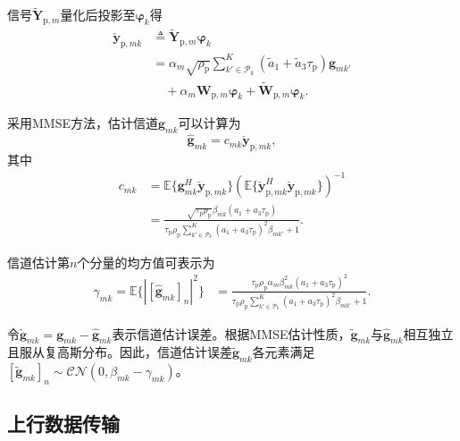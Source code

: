 信号$\tilde{\mathbf{Y}}_{\text{p},m}$量化后投影至$\boldsymbol{\varphi}_k$得
\begin{align}
\label{eqn-5}
\check{\mathbf{y}}_{\text{p},mk} &\triangleq\tilde{\mathbf{Y}}_{\text{p},m}\boldsymbol{\varphi}_k\nonumber\\
&=\alpha_m\sqrt{\rho_\text{p}}\sum_{k'\in\mathcal{P}_k}^{K}(\tilde{a}_1+\tilde{a}_3\tau_\text{p})\mathbf{g}_{mk'}\nonumber\\
&\quad+\alpha_m\mathbf{W}_{\text{p},m}\boldsymbol{\varphi}_k+\tilde{\mathbf{W}}_{\text{p},m}\boldsymbol{\varphi}_k.
\end{align}
\begin{lemma}\label{lemma1}
	\rm{采用MMSE方法，估计信道$\mathbf{g}_{mk}$可以计算为}
	\setlength\arraycolsep{1pt}   %
	\begin{equation}
		\label{eqn-6}
		\hat{\mathbf{g}}_{mk}=c_{mk}\check{\mathbf{y}}_{\text{p},mk},
	\end{equation}
	其中
\begin{align}\label{eqn-7}
{c_{mk}}&=\mathbb{E}\{\mathbf{g}_{mk}^H\check{\mathbf{y}}_{\text{p},mk}\}\left(\mathbb{E}\{\check{\mathbf{y}}_{\text{p},mk}^H\check{\mathbf{y}}_{\text{p},mk}\}\right)^{-1}\nonumber\\
&=\frac{\sqrt{\tau_\text{p}\rho_\text{p}}\beta_{mk}(a_1+a_3\tau_\text{p})}{\tau_\text{p}\rho_\text{p}\sum_{k'\in\mathcal{P}_k}^{K}(a_1+a_3\tau_\text{p})^2\beta_{mk'}+1}.
\end{align}
\end{lemma}
信道估计第$n$个分量的均方值可表示为
\begin{align}
\label{eqn-8}
\gamma_{mk}=\mathbb{E}\{|[\hat{\mathbf{g}}_{mk}]_n|^2\}
&=\frac{\tau_\text{p}\rho_\text{p}\alpha_m\beta_{mk}^2(a_1+a_3\tau_\text{p})^2}{\tau_\text{p}\rho_\text{p}\sum_{k'\in\mathcal{P}_k}^{K}(a_1+a_3\tau_\text{p})^2\beta_{mk'}+1}.
\end{align}

令$\tilde{\mathbf{g}}_{mk}=\mathbf{g}_{mk}-\hat{\mathbf{g}}_{mk}$表示信道估计误差。根据MMSE估计性质，$\tilde{\mathbf{g}}_{mk}$与$\hat{\mathbf{g}}_{mk}$相互独立且服从复高斯分布。因此，信道估计误差$\tilde{\mathbf{g}}_{mk}$各元素满足$[\tilde{\mathbf{g}}_{mk}]_n\sim\mathcal{CN}(0,\beta_{mk}-\gamma_{mk})$。

\subsection{上行数据传输}

